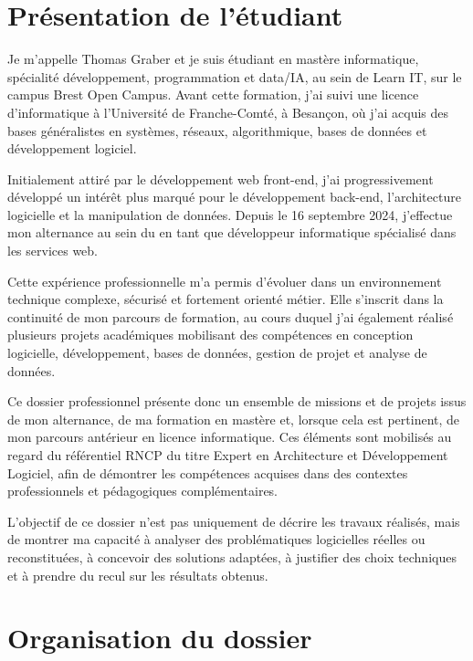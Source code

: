 \section*{Présentation de l'étudiant}
{}

Je m'appelle Thomas Graber et je suis étudiant en mastère informatique, spécialité développement, programmation et data/IA, au sein de Learn IT, sur le campus Brest Open Campus. Avant cette formation, j'ai suivi une licence d'informatique à l'Université de Franche-Comté, à Besançon, où j'ai acquis des bases généralistes en systèmes, réseaux, algorithmique, bases de données et développement logiciel.

Initialement attiré par le développement web front-end, j'ai progressivement développé un intérêt plus marqué pour le développement back-end, l'architecture logicielle et la manipulation de données. Depuis le 16 septembre 2024, j'effectue mon alternance au sein du  en tant que développeur informatique spécialisé dans les services web.

Cette expérience professionnelle m'a permis d'évoluer dans un environnement technique complexe, sécurisé et fortement orienté métier. Elle s'inscrit dans la continuité de mon parcours de formation, au cours duquel j'ai également réalisé plusieurs projets académiques mobilisant des compétences en conception logicielle, développement, bases de données, gestion de projet et analyse de données.

Ce dossier professionnel présente donc un ensemble de missions et de projets issus de mon alternance, de ma formation en mastère et, lorsque cela est pertinent, de mon parcours antérieur en licence informatique. Ces éléments sont mobilisés au regard du référentiel RNCP du titre Expert en Architecture et Développement Logiciel, afin de démontrer les compétences acquises dans des contextes professionnels et pédagogiques complémentaires.

L'objectif de ce dossier n'est pas uniquement de décrire les travaux réalisés, mais de montrer ma capacité à analyser des problématiques logicielles réelles ou reconstituées, à concevoir des solutions adaptées, à justifier des choix techniques et à prendre du recul sur les résultats obtenus.

\clearpage
\section*{Organisation du dossier}
{}

